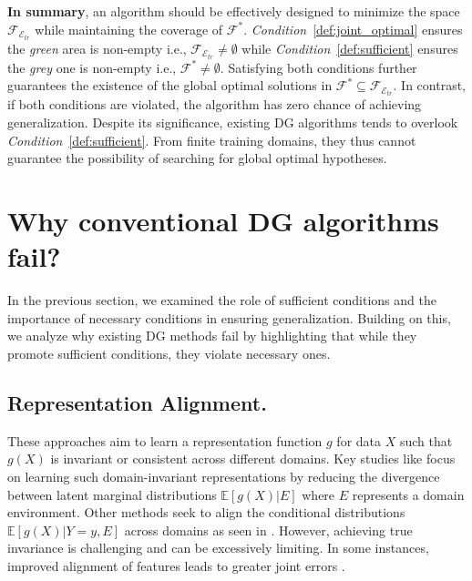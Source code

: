 \textbf{In summary}, an algorithm should be effectively designed to minimize the space $\mathcal{F}_{\mathcal{E}_{tr}}$ while maintaining the coverage of $\mathcal{F}^{*}$. \textit{Condition}~\ref{def:joint_optimal} ensures the \textit{green} area is non-empty i.e., $\mathcal{F}_{\mathcal{E}_{tr}} \ne \emptyset$ while  \textit{Condition}~\ref{def:sufficient} ensures the \textit{grey} one is non-empty i.e., $\mathcal{F}^{*} \ne \emptyset$. Satisfying both conditions further guarantees the existence of the global optimal solutions in $\mathcal{F}^{*} \subseteq \mathcal{F}_{\mathcal{E}_{tr}}$. In contrast, if both conditions are violated, the algorithm has zero chance of achieving generalization. Despite its significance, existing DG algorithms tends to overlook \textit{Condition}~\ref{def:sufficient}. From finite training domains, they thus cannot guarantee the possibility of searching for global optimal hypotheses. 




\section{Why conventional DG algorithms fail?} 
 \label{sec:discussion_DG}

In the previous section, we examined the role of sufficient conditions and the importance of necessary conditions in ensuring generalization. Building on this, we analyze why existing DG methods fail by highlighting that while they promote sufficient conditions, they violate necessary ones.

\subsection{Representation Alignment.} These approaches aim to learn a representation function $g$ for data $X$ such that $g(X)$ is invariant or consistent across different domains. Key studies like \citep{long2017conditional, ganin2016domain, li2018domain, nguyen2021domain, shen2018wasserstein, xie2017controllable, ilse2020diva} focus on learning such domain-invariant representations by reducing the divergence between latent marginal distributions $\mathbb{E}[g(X) | E]$ where $E$ represents a domain environment. Other methods seek to align the conditional distributions $\mathbb{E}[g(X) | Y=y, E]$ across domains as seen in \citep{li2018domain_b, tachet2020domain}. However, achieving true invariance is challenging and can be excessively limiting. In some instances, improved alignment of features leads to greater joint errors \citep{johansson2019support, zhao2019learning, phung2021learning, le2021lamda}.


